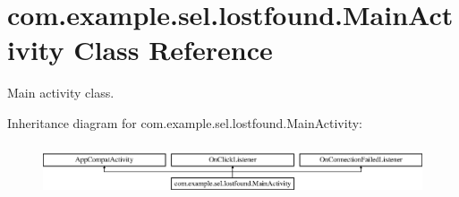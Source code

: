 \hypertarget{classcom_1_1example_1_1sel_1_1lostfound_1_1MainActivity}{\section{com.\-example.\-sel.\-lostfound.\-Main\-Activity Class Reference}
\label{classcom_1_1example_1_1sel_1_1lostfound_1_1MainActivity}
}


Main activity class.  


Inheritance diagram for com.\-example.\-sel.\-lostfound.\-Main\-Activity\-:\begin{figure}[H]
\begin{center}
\leavevmode
\includegraphics[height=1.542700cm]{classcom_1_1example_1_1sel_1_1lostfound_1_1MainActivity}
\end{center}
\end{figure}
